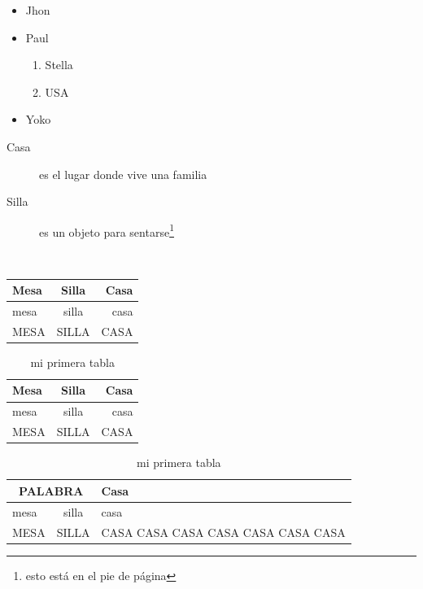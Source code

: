 \documentclass[12pt,a4paper]{article}
\begin{document}
\begin{itemize}
	\item Jhon
	\item Paul
	\begin{enumerate}
		\item Stella
		\item USA
	\end{enumerate}
	\item Yoko
\end{itemize}

\begin{description}
	\item[Casa] es el lugar donde vive una familia
	\item [Silla] es un objeto para sentarse\footnote{esto está en el pie de página}
\end{description}
\ \\[2cm]
\begin{tabular}{|l|c|r|}
	\hline
Mesa & Silla & Casa \\
\hline
mesa & silla & casa \\
\hline
MESA & SILLA & CASA\\
\hline
\end{tabular}

\renewcommand{\spanishtablename}{Tablita}
\begin{table}[H]
	\centering
	\caption{mi primera tabla}\label{tab1}
	\begin{tabular}{|l|c|r|}
		\hline
		Mesa & Silla & Casa \\
		\hline
		mesa & silla & casa \\
		\hline
		MESA & SILLA & CASA\\
		\hline
	\end{tabular}
	
\end{table}

\begin{table}[H]
	\centering
	\caption{mi primera tabla}\label{tab2}
	\begin{tabular}{|l|c|p{3cm}|}
		\hline
		\multicolumn{2}{|c|}{PALABRA} & Casa \\
		\hline
		mesa & silla & casa \\
		\cline{2-3}
		MESA & SILLA & CASA \newline CASA CASA CASA CASA CASA CASA\\
		\hline
	\end{tabular}
	
\end{table}
\end{document}
